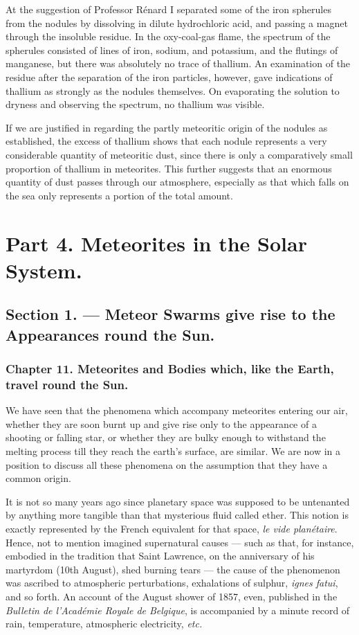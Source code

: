 \documentclass[a4paper, 12pt, oneside, polutonikogreek, english]{article}
\begin{document}
At the suggestion of Professor Rénard I separated some of the iron spherules from the nodules by dissolving in dilute hydrochloric acid, and passing a magnet through the insoluble residue. In the oxy-coal-gas flame, the spectrum of the spherules consisted of lines of iron, sodium, and potassium, and the flutings of manganese, but there was absolutely no trace of thallium. An examination of the residue after the separation of the iron particles, however, gave indications of thallium as strongly as the nodules themselves. On evaporating the solution to dryness and observing the spectrum, no thallium was visible.

If we are justified in regarding the partly meteoritic origin of the nodules as established, the excess of thallium shows that each nodule represents a very considerable quantity of meteoritic dust, since there is only a comparatively small proportion of thallium in meteorites. This further suggests that an enormous quantity of dust passes through our atmosphere, especially as that which falls on the sea only represents a portion of the total amount.

\section{Part 4. Meteorites in the Solar System.}

\subsection{Section 1. --- Meteor Swarms give rise to the Appearances round the Sun.}

\subsubsection{Chapter 11. Meteorites and Bodies which, like the Earth, travel round the Sun.}

We have seen that the phenomena which accompany meteorites entering our air, whether they are soon burnt up and give rise only to the appearance of a shooting or falling star, or whether they are bulky enough to withstand the melting process till they reach the earth's surface, are similar. We are now in a position to discuss all these phenomena on the assumption that they have a common origin.

It is not so many years ago since planetary space was supposed to be untenanted by anything more tangible than that mysterious fluid called ether. This notion is exactly represented by the French equivalent for that space, \emph{le vide planétaire}. Hence, not to mention imagined supernatural causes --- such as that, for instance, embodied in the tradition that Saint Lawrence, on the anniversary of his martyrdom (10th August), shed burning tears --- the cause of the phenomenon was ascribed to atmospheric perturbations, exhalations of sulphur, \emph{ignes fatui}, and so forth. An account of the August shower of 1857, even, published in the \emph{Bulletin de l'Académie Royale de Belgique}, is accompanied by a minute record of rain, temperature, atmospheric electricity, \emph{etc.}
\end{document}
